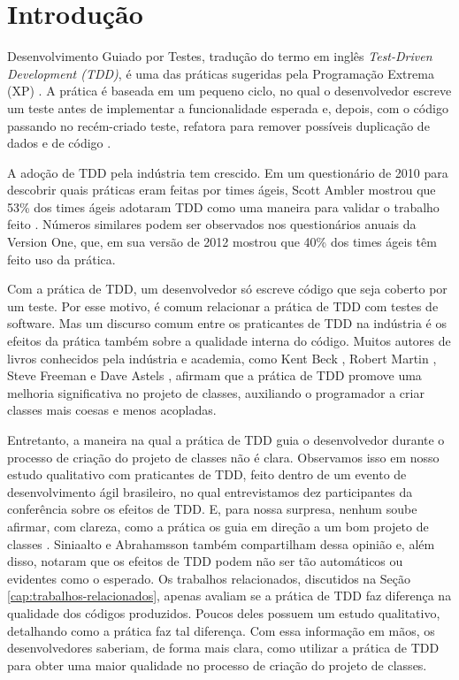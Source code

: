 \documentclass[conference]{IEEEtran}
\begin{document}

\IEEEpeerreviewmaketitle

\section{Introdução}

Desenvolvimento Guiado por Testes, tradução do termo
em inglês \textit{Test-Driven Development (TDD)},
é uma das práticas sugeridas pela Programação
Extrema (XP) \cite{XPExplained}. A prática é baseada em um pequeno ciclo, 
no qual o desenvolvedor escreve um teste antes
de implementar a funcionalidade esperada e, depois, com o código
passando no recém-criado teste, refatora para 
remover possíveis duplicação de dados e de código \cite{TDDByExample}.

A adoção de TDD pela indústria tem crescido. 
Em um questionário de 2010 para descobrir quais práticas eram feitas por times
ágeis, Scott Ambler mostrou que 53\% dos times ágeis
adotaram TDD como uma maneira para validar o trabalho feito \cite{wambler-survey-agile}.
Números similares podem ser observados nos questionários anuais da Version One, que,
em sua versão de 2012 \cite{versionone-2012} mostrou que 40\% dos times ágeis têm 
feito uso da prática.

Com a prática de TDD, um desenvolvedor só escreve código
que seja coberto por um teste. Por esse motivo, é comum relacionar a prática
de TDD com testes de software. Mas um discurso comum entre os praticantes de TDD
na indústria é os efeitos da prática também sobre a qualidade interna do código.
Muitos autores de livros conhecidos pela indústria e academia, como
Kent Beck \cite{TDDByExample}, Robert Martin \cite{agile-ppp}, 
Steve Freeman \cite{GOOS} e Dave Astels \cite{astels-tdd}, afirmam que a prática de TDD
promove uma melhoria significativa no projeto de classes, auxiliando
o programador a criar classes mais coesas e menos acopladas.

Entretanto, a maneira na qual a prática de TDD guia o desenvolvedor
durante o processo de criação do projeto de classes não é clara. Observamos
isso em nosso estudo qualitativo com praticantes de TDD, feito dentro de um
evento de desenvolvimento ágil brasileiro, no qual entrevistamos dez
participantes da conferência sobre os efeitos de TDD. E, para nossa surpresa,
nenhum soube afirmar, com clareza, como a prática os guia em direção
a um bom projeto de classes \cite{aniche-wbma}.
Siniaalto e Abrahamsson \cite{alarming-results} também
compartilham dessa opinião e, além disso, notaram que os efeitos de TDD podem 
não ser tão automáticos ou evidentes como o esperado.
Os trabalhos relacionados, discutidos na Seção \ref{cap:trabalhos-relacionados},
apenas avaliam se a prática de TDD faz diferença na qualidade dos códigos produzidos.
Poucos deles possuem um estudo qualitativo, detalhando como a prática
faz tal diferença.
Com essa informação em mãos, os desenvolvedores saberiam, de forma mais clara,
como utilizar a prática de TDD para obter uma maior qualidade no processo de criação
do projeto de classes. 
\end{document}
